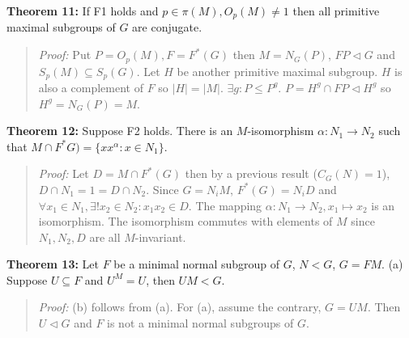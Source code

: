{\bf Theorem 11:}
If F1 holds and $p \in \pi(M), O_p(M) \neq 1$ then all primitive maximal subgroups of $G$ are
conjugate.
\begin{quote}
\emph{Proof:}  
Put $P= O_p(M), F= F^*(G)$ then $M= N_G(P)$, $FP \lhd G$ and $S_p(M) \subseteq S_p(G)$.  Let
$H$ be another primitive maximal subgroup.  $H$ is also a complement of $F$ so $|H|=|M|$.
$\exists g: P \leq P^g$.  $P= H^g \cap FP \lhd H^g$ so $H^g= N_G(P)= M$.
\end{quote}
{\bf Theorem 12:}
Suppose F2 holds.   There is an $M$-isomorphism $\alpha: N_1 \rightarrow N_2$ such that
$M \cap F^*G) = \{ x x^{\alpha}: x \in N_1 \}$.
\begin{quote}
\emph{Proof:}  
Let $D= M \cap F^*(G)$ then by a previous result ($C_G(N)=1$), $ D \cap N_1 = 1 = D \cap N_2$. 
Since $G= N_iM$, $F^*(G)= N_iD$ and $\forall x_1 \in N_1, \exists ! x_2 \in N_2: x_1 x_2 \in D$.
The mapping $\alpha: N_1 \rightarrow N_2, x_1 \mapsto x_2$ is an isomorphism.  The isomorphism
commutes with  elements of $M$ since $N_1, N_2, D$ are all $M$-invariant.
\end{quote}
{\bf Theorem 13:}
Let $F$ be a minimal normal subgroup of $G$, $N<G$, $G= FM$.
(a) Suppose $U \subseteq F$ and $U^M=U$, then $UM<G$.
\begin{quote}
\emph{Proof:}  
(b) follows from (a).  For (a), assume the contrary, $G=UM$.  Then $U \lhd G$ and $F$ is not a minimal
normal subgroups of $G$.
\end{quote}
